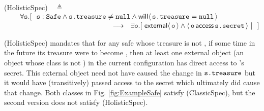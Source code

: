   \vspace{.01in}
(HolisticSpec)\ \  $\triangleq$\\ 
$\strut \hspace{.3in}   \forall \prg{s}. %
[\ \ \prg{s}:\prg{Safe} \wedge \prg{s.treasure}\neq\prg{null}   \wedge   \Future{\prg{s.treasure}=\prg{null}} $ \\ 
 $ \strut \hspace{5.3cm}     \longrightarrow \ \  \exists \prg{o}. [\  \External{\prg{o}} \wedge  \CanAccess{\prg{o}}{\prg{s.secret}}\ ]  \  \ ] \hfill $
\vspace{-.05in}

(HolisticSpec) mandates that for any safe 
whose treasure is not , 
if some time in the future its treasure were to become ,
then at least one external object (\ie an object whose class is not ) in the current configuration
has direct access to 's secret. This external object need not have caused the change in ${\mbox{\tt{s.treasure}}}$ but it would 
 have (transitively) passed access to the secret which ultimately did cause that change.
%
Both classes in Fig. \ref{fig:ExampleSafe} satisfy (ClassicSpec), but the second version does not satisfy 
(HolisticSpec).
% 
%
\vspace{.02in}
%
% 

